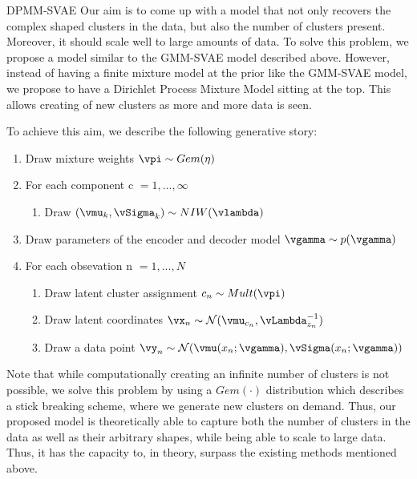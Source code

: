 \documentclass{article}
\begin{document}
\begin{psection}{DPMM-SVAE}
Our aim is to come up with a model that not only recovers the complex shaped clusters in the data, but also the number of clusters present. Moreover, it should scale well to large amounts of data. To solve this problem, we propose a model similar to the GMM-SVAE model described above. However, instead of having a finite mixture model at the prior like the GMM-SVAE model, we propose to have a Dirichlet Process Mixture Model sitting at the top. This allows creating of new clusters as more and more data is seen.

To achieve this aim, we describe the following generative story:

	\begin{enumerate}
		\item Draw mixture weights $\vpi \sim Gem(\eta)$
		\item {For each component  c $= 1,...,\infty$
			\begin{enumerate}
			    \item Draw $(\vmu_k,\vSigma_k) \sim NIW(\vlambda)$
			\end{enumerate}}
		\item Draw parameters of the encoder and decoder model $\vgamma \sim p(\vgamma)$
		\item For each obsevation n $= 1,...,N$
				\begin{enumerate}
					\item Draw latent cluster assignment $c_n \sim Mult(\vpi)$
					\item Draw latent coordinates $\vx_n \sim \mathcal{N}(\vmu_{c_n},\vLambda_{z_n}^{-1})$
					\item Draw a data point $\vy_n \sim \mathcal{N}(\vmu(x_n;\vgamma),\vSigma(x_n;\vgamma))$
			\end{enumerate}
	\end{enumerate}
Note that while computationally creating an infinite number of clusters is not possible, we solve this problem by using a $Gem(\cdot)$ distribution which describes a stick breaking scheme, where we generate new clusters on demand. Thus, our proposed model is theoretically able to capture both the number of clusters in the data as well as their arbitrary shapes, while being able to scale to large data. Thus, it has the capacity to, in theory, surpass the existing methods mentioned above.
\end{psection}
\end{document}
